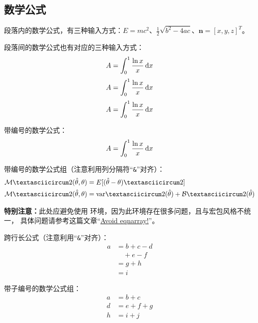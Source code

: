 \subsection{数学公式}
段落内的数学公式，有三种输入方式：$E=mc^2$、\(\frac{1}{2}\sqrt{b^2-4ac}\)、\begin{math}\mathbf{n}=[x, y, z]^T\end{math}。

段落间的数学公式也有对应的三种输入方式：
$$A=\int_0^1 \frac{\ln{x}}{x}\mathop{}\!\mathrm{d} x$$
\[
A=\int_0^1 \frac{\ln{x}}{x}\mathop{}\!\mathrm{d} x
\]
\begin{displaymath}
A=\int_0^1 \frac{\ln{x}}{x}\mathop{}\!\mathrm{d} x
\end{displaymath}

带编号的数学公式：
\begin{equation}\label{eq:samples:one}
A=\int_0^1 \frac{\ln{x}}{x}\mathop{}\!\mathrm{d} x
\end{equation}

带编号的数学公式组（注意利用列分隔符“\texttt{\&}”对齐）：
\begin{align}
{\cal M}ˆ2(\hat{\theta},\theta) &= E[(\hat{\theta} - \theta)ˆ2] \\
{\cal M}ˆ2(\hat{\theta},\theta) &= \textrm{var}ˆ2(\hat{\theta}) + {\cal B}ˆ2(\hat{\theta})
\end{align}

\textbf{特别注意：}此处应避免使用  环境，因为此环境存在很多问题，且与宏包风格不统一，
具体问题请参考这篇文章“\href{https://tug.org/pracjourn/2006-4/madsen/madsen.pdf}{Avoid eqnarray!}”。

跨行长公式（注意利用“\texttt{\&}”对齐）：
\begin{equation}
\begin{split}
a& =b+c-d\\
 & \quad +e-f\\
 & =g+h\\
 & =i
\end{split}
\end{equation}

带子编号的数学公式组：
\begin{subequations}\label{eq:samples:grp}
\begin{align}
a&=b+c\label{eq:samples:grp:a}\\
d&=e+f+g\label{eq:samples:grp:b}\\
h&=i+j\label{eq:samples:grp:c}
\end{align}
\end{subequations}


